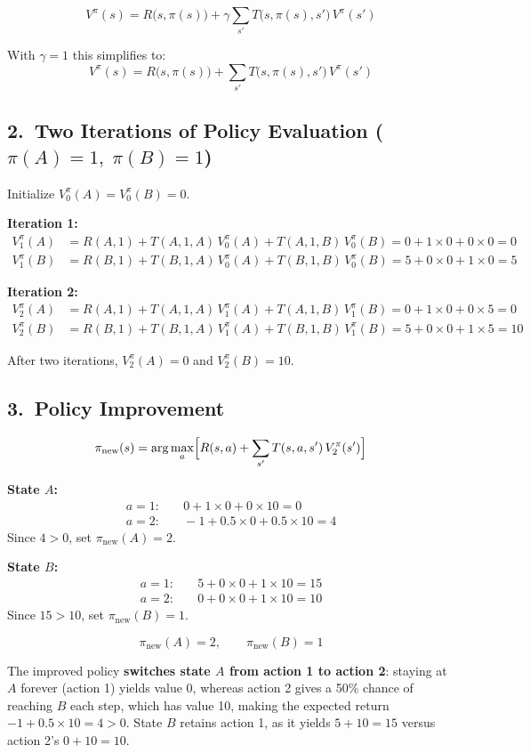 \documentclass[12pt]{article}
\begin{document}
\[
V^{\pi}(s)=R\bigl(s,\pi(s)\bigr)+\gamma\sum_{s'}T\bigl(s,\pi(s),s'\bigr)\,V^{\pi}(s')
\]

With $\gamma=1$ this simplifies to:
\[
\boxed{V^{\pi}(s)=R\bigl(s,\pi(s)\bigr)+\sum_{s'}T\bigl(s,\pi(s),s'\bigr)\,V^{\pi}(s')}
\]

\subsection*{2.\ Two Iterations of Policy Evaluation ($\pi(A)=1,\;\pi(B)=1$)}

Initialize $V^{\pi}_0(A)=V^{\pi}_0(B)=0$.

\textbf{Iteration 1:}
\begin{align*}
V^{\pi}_1(A)&=R(A,1)+T(A,1,A)\,V^{\pi}_0(A)+T(A,1,B)\,V^{\pi}_0(B)
             =0+1\times0+0\times0=0\\
V^{\pi}_1(B)&=R(B,1)+T(B,1,A)\,V^{\pi}_0(A)+T(B,1,B)\,V^{\pi}_0(B)
             =5+0\times0+1\times0=5
\end{align*}

\textbf{Iteration 2:}
\begin{align*}
V^{\pi}_2(A)&=R(A,1)+T(A,1,A)\,V^{\pi}_1(A)+T(A,1,B)\,V^{\pi}_1(B)
             =0+1\times0+0\times5=\boxed{0}\\
V^{\pi}_2(B)&=R(B,1)+T(B,1,A)\,V^{\pi}_1(A)+T(B,1,B)\,V^{\pi}_1(B)
             =5+0\times0+1\times5=\boxed{10}
\end{align*}

After two iterations, $V^{\pi}_2(A)=0$ and $V^{\pi}_2(B)=10$.

\subsection*{3.\ Policy Improvement}

\[
\pi_{\text{new}}(s)=\arg\max_{a}\Bigl[R(s,a)+\sum_{s'}T(s,a,s')\,V^{\pi}_2(s')\Bigr]
\]

\textbf{State $A$:}
\begin{align*}
a=1:&\quad 0+1\times0+0\times10=0\\
a=2:&\quad -1+0.5\times0+0.5\times10=4
\end{align*}
Since $4>0$, set $\boxed{\pi_{\text{new}}(A)=2}$.

\textbf{State $B$:}
\begin{align*}
a=1:&\quad 5+0\times0+1\times10=15\\
a=2:&\quad 0+0\times0+1\times10=10
\end{align*}
Since $15>10$, set $\boxed{\pi_{\text{new}}(B)=1}$.

\[
\boxed{\pi_{\text{new}}(A)=2,\qquad\pi_{\text{new}}(B)=1}
\]

The improved policy \textbf{switches state $A$ from action 1 to action 2}: staying at $A$
forever (action 1) yields value 0, whereas action 2 gives a 50\% chance of reaching $B$
each step, which has value 10, making the expected return $-1+0.5\times10=4>0$.
State $B$ retains action 1, as it yields $5+10=15$ versus action 2's $0+10=10$.
\end{document}
